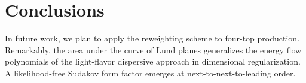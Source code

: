 \section{Conclusions}\label{sec:conclusions}

In future work, we plan to apply the reweighting scheme to four-top
production. Remarkably, the area under the curve of Lund planes
generalizes the energy flow polynomials of the light-flavor dispersive
approach in dimensional regularization. A likelihood-free Sudakov form
factor emerges at next-to-next-to-leading order.

